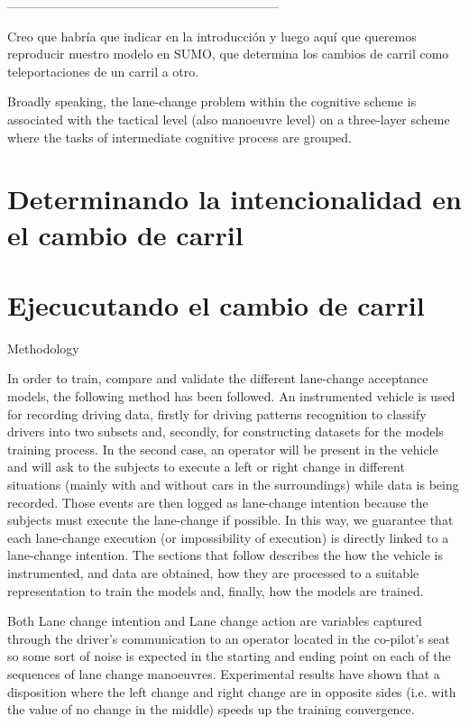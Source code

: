 {-----------------------------------------------------------------

\TODO Creo que habría que indicar en la introducción y luego aquí que queremos reproducir nuestro modelo en SUMO, que determina los cambios de carril como teleportaciones de un carril a otro.

Broadly speaking, the lane-change problem within the cognitive scheme is associated with the tactical level (also manoeuvre level) on a three-layer scheme where the tasks of intermediate cognitive process are grouped.



\section{Determinando la intencionalidad en el cambio de carril}
\label{s:lane-change-intention}

\section{Ejecucutando el cambio de carril}
\label{s:lane-change-execution}


Methodology

In order to train, compare and validate the different lane-change acceptance models, the following method has been followed. An instrumented vehicle is used for recording driving data, firstly for driving patterns recognition to classify drivers into two subsets and, secondly, for constructing datasets for the models training process. In the second case, an operator will be present in the vehicle and will ask to the subjects to execute a left or right change in different situations (mainly with and without cars in the surroundings) while data is being recorded. Those events are then logged as lane-change intention because the subjects must execute the lane-change if possible. In this way, we guarantee that each lane-change execution (or impossibility of execution) is directly linked to a lane-change intention.
The sections that follow describes the how the vehicle is instrumented, and data are obtained, how they are processed to a suitable representation to train the models and, finally, how the models are trained.

Both Lane change intention and Lane change action are variables captured through the driver’s communication to an operator located in the co-pilot’s seat so some sort of noise is expected in the starting and ending point on each of the sequences of lane change manoeuvres. Experimental results have shown that a disposition where the left change and right change are in opposite sides (i.e. with the value of no change in the middle) speeds up the training convergence.


}
